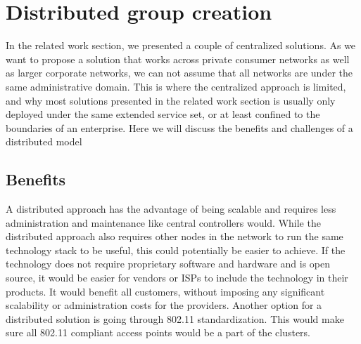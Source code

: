 \section{Distributed group creation}
In the related work section, we presented a couple of centralized solutions. As we want to propose a solution that works across private consumer networks as well as larger corporate networks,
we can not assume that all networks are under the same administrative domain. This is where the centralized approach is limited, and why most solutions presented in the related work section is usually only deployed under the same extended service set, or at least confined to the boundaries of an enterprise. Here we will discuss the benefits and challenges of a distributed model  

\subsection{Benefits}
A distributed approach has the advantage of being scalable and requires less administration and maintenance like central controllers would. 
While the distributed approach also requires other nodes in the network to run the same technology stack to be useful, this could potentially be easier to achieve.
If the technology does not require proprietary software and hardware and is open source, it would be easier for vendors or ISPs to include the technology in their products.
It would benefit all customers, without imposing any significant scalability or administration costs for the providers. Another option for a distributed solution is going through
802.11 standardization. This would make sure all 802.11 compliant access points would be a part of the clusters. 

